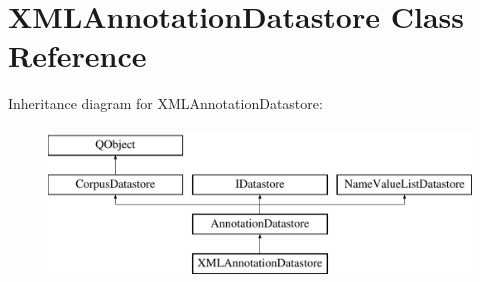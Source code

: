 \hypertarget{class_x_m_l_annotation_datastore}{}\section{X\+M\+L\+Annotation\+Datastore Class Reference}
\label{class_x_m_l_annotation_datastore}
Inheritance diagram for X\+M\+L\+Annotation\+Datastore\+:\begin{figure}[H]
\begin{center}
\leavevmode
\includegraphics[height=4.000000cm]{class_x_m_l_annotation_datastore}
\end{center}
\end{figure}
